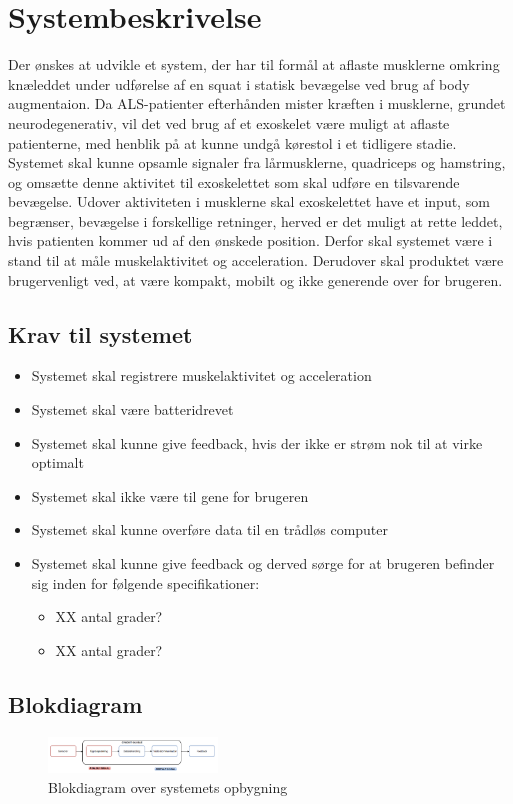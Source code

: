 \section{Systembeskrivelse}
Der ønskes at udvikle et system, der har til formål at aflaste musklerne omkring knæleddet under udførelse af en squat i statisk bevægelse ved brug af body augmentaion. Da ALS-patienter efterhånden mister kræften i musklerne, grundet neurodegenerativ, vil det ved brug af et exoskelet være muligt at aflaste patienterne, med henblik på at kunne undgå kørestol i et tidligere stadie. Systemet skal kunne opsamle signaler fra lårmusklerne, quadriceps og hamstring, og omsætte denne aktivitet til exoskelettet som skal udføre en tilsvarende bevægelse. Udover aktiviteten i musklerne skal exoskelettet have et input, som begrænser, bevægelse i forskellige retninger, herved er det muligt at rette leddet, hvis patienten kommer ud af den ønskede position. Derfor skal systemet være i stand til at måle muskelaktivitet og acceleration. Derudover skal produktet være brugervenligt ved, at være kompakt, mobilt og ikke generende over for brugeren.

\subsection{Krav til systemet} 
\begin{itemize}
\item Systemet skal registrere muskelaktivitet og acceleration
\item Systemet skal være batteridrevet
\item Systemet skal kunne give feedback, hvis der ikke er strøm nok til at virke optimalt
\item Systemet skal ikke være til gene for brugeren
\item Systemet skal kunne overføre data til en trådløs computer
\item Systemet skal kunne give feedback og derved sørge for at brugeren befinder sig inden for følgende specifikationer:
\begin{itemize}
\item XX antal grader?
\item XX antal grader?
\end{itemize}
\end{itemize}


\subsection{Blokdiagram}
\begin{figure}[H]
\centering
\includegraphics[width=0.4\textwidth]{figures/blokdiagram.png}
\caption{Blokdiagram over systemets opbygning}
\label{fig:blokdiagram}
\end{figure}

